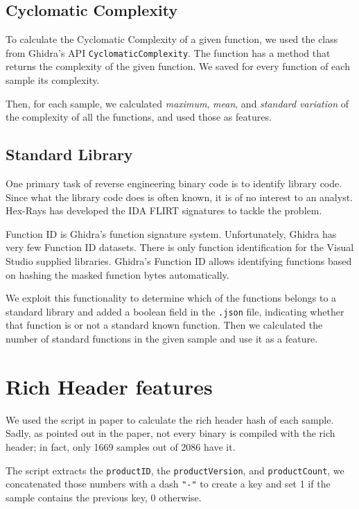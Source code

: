 \subsection{Cyclomatic Complexity}

To calculate the Cyclomatic Complexity of a given function, we used the class from Ghidra's API \texttt{CyclomaticComplexity}. The function has a method that returns the complexity of the given function. We saved for every function of each sample its complexity. 

Then, for each sample, we calculated \textit{maximum}, \textit{mean}, and \textit{standard variation} of the complexity of all the functions, and used those as features.

\subsection{Standard Library}

One primary task of reverse engineering binary code is to identify library code. Since what the library code does is often known, it is of no interest to an analyst. Hex-Rays has developed the IDA FLIRT signatures to tackle the problem. 

Function ID is Ghidra's function signature system. Unfortunately, Ghidra has very few Function ID datasets. There is only function identification for the Visual Studio supplied libraries. Ghidra's Function ID allows identifying functions based on hashing the masked function bytes automatically\cite{ghidra_fid}.

We exploit this functionality to determine which of the functions belongs to a standard library and added a boolean field in the \texttt{.json} file, indicating whether that function is or not a standard known function. Then we calculated the number of standard functions in the given sample and use it as a feature.

\section{Rich Header features}
We used the script in paper \cite{dubyk2019sans} to calculate the rich header hash of each sample. Sadly, as pointed out in the paper, not every binary is compiled with the rich header; in fact, only 1669 samples out of 2086 have it. 

The script extracts the \texttt{productID}, the \texttt{productVersion}, and \texttt{productCount}, we concatenated those numbers with a dash \texttt{"-"} to create a key and set 1 if the sample contains the previous key, 0 otherwise.

